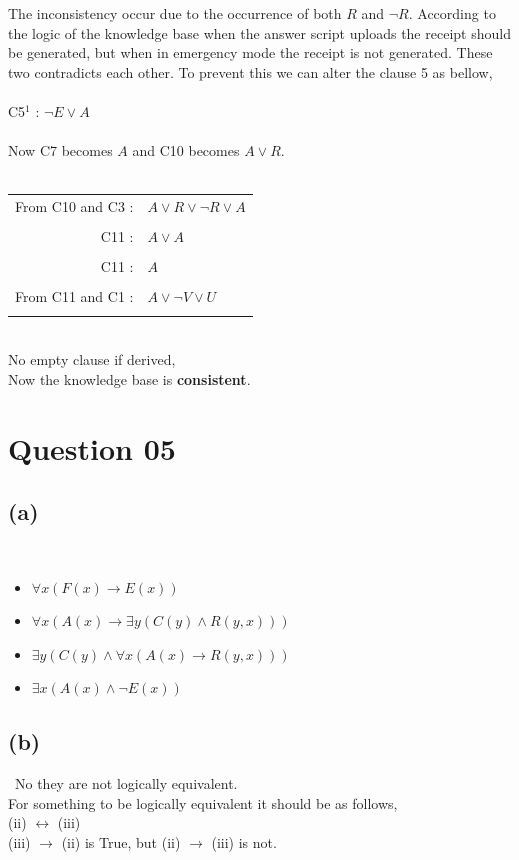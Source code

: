 \documentclass[a4paper,12pt]{article}
\begin{document}
The inconsistency occur due to the occurrence of both $R$ and $\neg R$. According to the logic of the knowledge base when the answer script uploads the receipt should be generated, but when in emergency mode the receipt is not generated. These two contradicts each other. To prevent this we can alter the clause 5 as bellow,\\\\
C5$^1$ : $\neg E \lor A$\\\\
Now C7 becomes $A$ and C10 becomes $A \lor R$.\\\\
\begin{tabular}{rl}
    From C10 and C3 : & $A \lor R \lor \neg R \lor A$ \\\\
    C11 : & $A \lor A$ \\\\
    C11 : & $A$ \\\\
    From C11 and C1 : & $A \lor \neg V \lor U$\\\\
\end{tabular}
\,\\
No empty clause if derived,\\
Now the knowledge base is \textbf{consistent}.

\newpage
\section{Question 05}
\subsection{(a)}
\,
\begin{itemize}
    \item[( i )] $\forall x (F(x) \rightarrow E(x))$
    \item[( ii )] $\forall x (A(x) \rightarrow \exists y(C(y) \land R(y,x)))$
    \item[( iii )] $\exists y (C(y) \land \forall x(A(x) \rightarrow R(y,x)))$
    \item[( iv )] $\exists x (A(x) \land \neg E(x))$
\end{itemize}

\subsection{(b)}
\,
No they are not logically equivalent.\\
For something to be logically equivalent it should be as follows,\\
(ii) $\leftrightarrow$ (iii)\\
(iii) $\rightarrow$ (ii) is True, but (ii) $\rightarrow$ (iii) is not.\\\\
\end{document}
